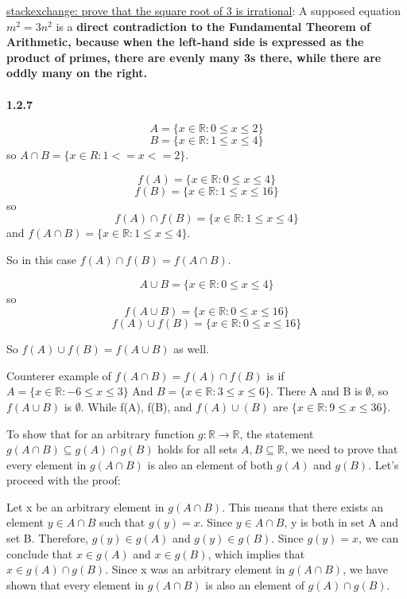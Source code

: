\href{https://math.stackexchange.com/questions/930486/prove-that-the-square-root-of-3-is-irrational}{stackexchange: prove that the square root of 3 is irrational}:
A supposed equation $m^2 = 3n^2$ is a \textbf{direct contradiction to the Fundamental Theorem of Arithmetic,
because when the left-hand side is expressed as the product of primes, there are evenly many 3s there,
while there are oddly many on the right.}
\\~\\




\textbf{1.2.7}

$$
A = \{x \in \mathbb{R} : 0 \leq x \leq 2\}
$$
$$
B = \{x \in \mathbb{R} : 1 \leq x \leq 4\}
$$
so $A \cap B = \{x \in R : 1 <= x <= 2 \}$. 

$$
f(A) = \{ x \in \mathbb{R} : 0 \leq x \leq 4 \}
$$
$$
f(B) = \{ x \in \mathbb{R} : 1 \leq x \leq 16 \}
$$
so
$$
f(A) \cap f(B) = \{ x \in \mathbb{R} : 1 \leq x \leq 4 \}
$$
and $f(A \cap B) = \{ x \in \mathbb{R} : 1 \leq x \leq 4 \}$.

So in this case $f(A) \cap f(B) = f(A \cap B)$.

$$
A \cup B = \{x \in \mathbb{R} : 0 \leq x \leq 4\}
$$
so 
$$
f(A \cup B) = \{x \in \mathbb{R} : 0 \leq x \leq 16\}
$$
$$
f(A) \cup f(B) = \{x \in \mathbb{R} : 0 \leq x \leq 16\}
$$

So $f(A) \cup f(B) = f(A \cup B)$ as well.

Counterer example of $f(A \cap B) = f(A) \cap f(B)$ is if $A = \{x \in \mathbb{R} : -6 \leq x \leq 3\}$ And
$B = \{x \in \mathbb{R} : 3 \leq x \leq 6\}$.
There A and B is $\emptyset$, so $f(A \cup B)$ is $\emptyset$.
While f(A), f(B), and $f(A) \cup (B)$ are $\{x \in \mathbb{R} : 9 \leq x \leq 36\}$.

To show that for an arbitrary function $g: \mathbb{R} \rightarrow \mathbb{R}$, the statement
$g(A \cap B) \subseteq g(A) \cap g(B)$ holds for all sets $A, B \subseteq \mathbb{R}$,
we need to prove that every element in $g(A \cap B)$ is also an element of both $g(A)$ and $g(B)$.
Let's proceed with the proof:

Let x be an arbitrary element in $g(A \cap B)$. This means that there exists an element $y \in A \cap B$ such that $g(y) = x$.
Since $y \in A \cap B$, y is both in set A and set B. Therefore, $g(y) \in g(A)$ and $g(y) \in g(B)$.
Since $g(y) = x$, we can conclude that $x \in g(A)$ and $x \in g(B)$, which implies that $x \in g(A) \cap g(B)$.
Since x was an arbitrary element in $g(A \cap B)$, we have shown that every element in $g(A \cap B)$ is also an element of $g(A) \cap g(B)$.

